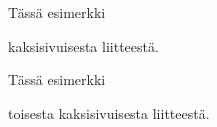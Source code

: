 \documentclass[a4paper,12pt,language=finnish,hidechapters=false]{utuftthesis}
\begin{document}
\startpages

%
%
%



%
%

\printbibliography
%
%

\pagebreak\addtocounter{page}{-1}
\appendices



Tässä esimerkki\pagebreak{}

kaksisivuisesta liitteestä.


Tässä esimerkki\pagebreak{}

toisesta kaksisivuisesta liitteestä.

%
%
%
%

%
%
\end{document}
